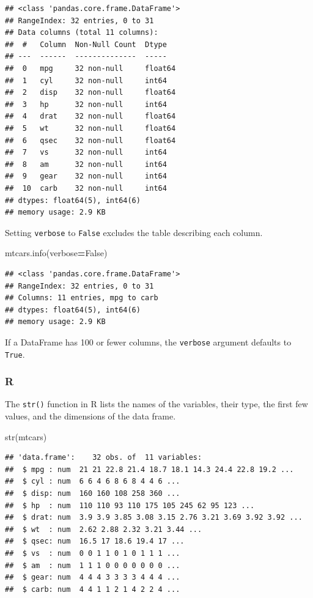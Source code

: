\documentclass[
]{book}
\newenvironment{Shaded}{\begin{snugshade}}{\end{snugshade}}
\newcommand{\FunctionTok}[1]{\textcolor[rgb]{0.00,0.00,0.00}{#1}}
\newcommand{\NormalTok}[1]{#1}
\newcommand{\OperatorTok}[1]{\textcolor[rgb]{0.81,0.36,0.00}{\textbf{#1}}}
\newcommand{\VariableTok}[1]{\textcolor[rgb]{0.00,0.00,0.00}{#1}}
\begin{document}
\begin{verbatim}
## <class 'pandas.core.frame.DataFrame'>
## RangeIndex: 32 entries, 0 to 31
## Data columns (total 11 columns):
##  #   Column  Non-Null Count  Dtype  
## ---  ------  --------------  -----  
##  0   mpg     32 non-null     float64
##  1   cyl     32 non-null     int64  
##  2   disp    32 non-null     float64
##  3   hp      32 non-null     int64  
##  4   drat    32 non-null     float64
##  5   wt      32 non-null     float64
##  6   qsec    32 non-null     float64
##  7   vs      32 non-null     int64  
##  8   am      32 non-null     int64  
##  9   gear    32 non-null     int64  
##  10  carb    32 non-null     int64  
## dtypes: float64(5), int64(6)
## memory usage: 2.9 KB
\end{verbatim}

Setting \texttt{verbose} to \texttt{False} excludes the table describing each column.

\begin{Shaded}
\begin{Highlighting}[]
\NormalTok{mtcars.info(verbose}\OperatorTok{=}\VariableTok{False}\NormalTok{)}
\end{Highlighting}
\end{Shaded}

\begin{verbatim}
## <class 'pandas.core.frame.DataFrame'>
## RangeIndex: 32 entries, 0 to 31
## Columns: 11 entries, mpg to carb
## dtypes: float64(5), int64(6)
## memory usage: 2.9 KB
\end{verbatim}

If a DataFrame has 100 or fewer columns, the \texttt{verbose} argument defaults to \texttt{True}.

\hypertarget{r-17}{%
\subsubsection*{R}\label{r-17}}

The \texttt{str()} function in R lists the names of the variables, their type, the first few values, and the dimensions of the data frame.

\begin{Shaded}
\begin{Highlighting}[]
\FunctionTok{str}\NormalTok{(mtcars)}
\end{Highlighting}
\end{Shaded}

\begin{verbatim}
## 'data.frame':    32 obs. of  11 variables:
##  $ mpg : num  21 21 22.8 21.4 18.7 18.1 14.3 24.4 22.8 19.2 ...
##  $ cyl : num  6 6 4 6 8 6 8 4 4 6 ...
##  $ disp: num  160 160 108 258 360 ...
##  $ hp  : num  110 110 93 110 175 105 245 62 95 123 ...
##  $ drat: num  3.9 3.9 3.85 3.08 3.15 2.76 3.21 3.69 3.92 3.92 ...
##  $ wt  : num  2.62 2.88 2.32 3.21 3.44 ...
##  $ qsec: num  16.5 17 18.6 19.4 17 ...
##  $ vs  : num  0 0 1 1 0 1 0 1 1 1 ...
##  $ am  : num  1 1 1 0 0 0 0 0 0 0 ...
##  $ gear: num  4 4 4 3 3 3 3 4 4 4 ...
##  $ carb: num  4 4 1 1 2 1 4 2 2 4 ...
\end{verbatim}
\end{document}
